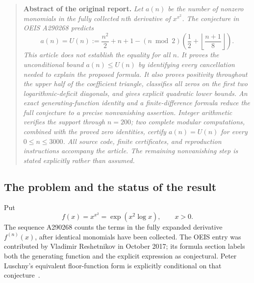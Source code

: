 \documentclass[11pt,a4paper]{article}
\numberwithin{equation}{section}
\theoremstyle{definition}
\theoremstyle{remark}
\theoremstyle{plain}
\newcommand{\U}{U}
\newcommand{\sibPTE}{\texttt{power-\allowbreak{}tower-\allowbreak{}exponent-\allowbreak{}supports}}
\newcommand{\sibAUD}{\texttt{a290268-\allowbreak{}unbounded-\allowbreak{}deficits}}
\begin{document}
\begin{quote}
\smallskip
[Added 1 October 2026, batch 72A: two sibling reports bear on this part without being part
of it.  \sibPTE{} proves $a(n)=n^2/2+o(n^2)$ (its Corollary~13.1),
without an effective threshold, which answers Question~6 of
Subsection~\ref{xxb:dc:sec:future}; \sibAUD{} studies the coefficients when
the deficit grows with $n$ (phase laws, an Airy law at the fold, cosine laws,
arithmetic families).  Neither proves Conjecture~\ref{xxb:conj:support}.]

\medskip
\textbf{Abstract of the original report.}\itshape
Let $a(n)$ be the number of nonzero monomials in the fully collected $n$th
derivative of $x^{x^2}$. The conjecture in OEIS A290268 predicts
\[
 a(n)=\U(n):=\frac{n^2}{2}+n+1
 -(n\bmod2)\left(\frac12+\left\lfloor\frac{n+1}{8}\right\rfloor\right).
\]
This article does \upshape\emph{not}\itshape{} establish the equality for all
$n$. It proves the
unconditional bound $a(n)\le\U(n)$ by identifying every cancellation needed to
explain the proposed formula. It also proves positivity throughout the upper
half of the coefficient triangle, classifies all zeros on the first two
logarithmic-deficit diagonals, and gives explicit quadratic lower bounds.
An exact generating-function identity and a finite-difference formula reduce
the full conjecture to a precise nonvanishing assertion. Integer arithmetic
verifies the support through $n=200$; two complete modular computations,
combined with the proved zero identities, certify $a(n)=\U(n)$ for every
$0\le n\le3000$. All source code, finite certificates, and reproduction
instructions accompany the article. The remaining nonvanishing step is
stated explicitly rather than assumed.
\end{quote}

\subsection{The problem and the status of the result}\label{xxb:sec:introduction}
Put
\[
 f(x)=x^{x^2}=\exp(x^2\log x),\qquad x>0.
\]
The sequence A290268 counts the terms in the fully expanded derivative
$f^{(n)}(x)$, after identical monomials have been collected. The OEIS entry
was contributed by Vladimir Reshetnikov in October 2017; its formula section
labels both the generating function and the explicit expression as
conjectural. Peter Luschny's equivalent floor-function form is explicitly
conditional on that conjecture~\cite{oeis290268}.
\end{document}
